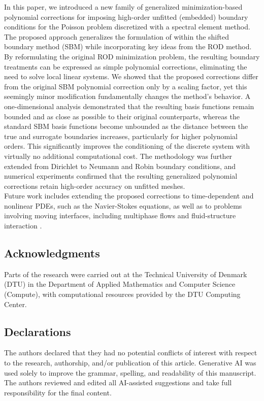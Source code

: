 \documentclass{article}
\begin{document}
In this paper, we introduced a new family of generalized minimization-based polynomial corrections for imposing high-order unfitted (embedded) boundary conditions for the Poisson problem discretized with a spectral element method. The proposed approach generalizes the formulation of \cite{ciallella2023shifted, visbech2025spectral} within the shifted boundary method (SBM) while incorporating key ideas from the ROD method. By reformulating the original ROD minimization problem, the resulting boundary treatments can be expressed as simple polynomial corrections, eliminating the need to solve local linear systems. We showed that the proposed corrections differ from the original SBM polynomial correction only by a scaling factor, yet this seemingly minor modification fundamentally changes the method's behavior. A one-dimensional analysis demonstrated that the resulting basis functions remain bounded and as close as possible to their original counterparts, whereas the standard SBM basis functions become unbounded as the distance between the true and surrogate boundaries increases, particularly for higher polynomial orders. This significantly improves the conditioning of the discrete system with virtually no additional computational cost. The methodology was further extended from Dirichlet to Neumann and Robin boundary conditions, and numerical experiments confirmed that the resulting generalized polynomial corrections retain high-order accuracy on unfitted meshes.\\ \newline 
Future work includes extending the proposed corrections to time-dependent and nonlinear PDEs, such as the Navier-Stokes equations, as well as to problems involving moving interfaces, including multiphase flows and fluid-structure interaction \cite{monasse2012conservative,desmons2024fully}.


\subsection*{Acknowledgments}
Parts of the research were carried out at the Technical University of Denmark (DTU) in the Department of Applied Mathematics and Computer Science (Compute), with computational resources provided by the DTU Computing Center.

\subsection*{Declarations}
The authors declared that they had no potential conflicts of interest with respect to the research, authorship, and/or publication of this article. Generative AI was used solely to improve the grammar, spelling, and readability of this manuscript. The authors reviewed and edited all AI-assisted suggestions and take full responsibility for the final content.
\end{document}
